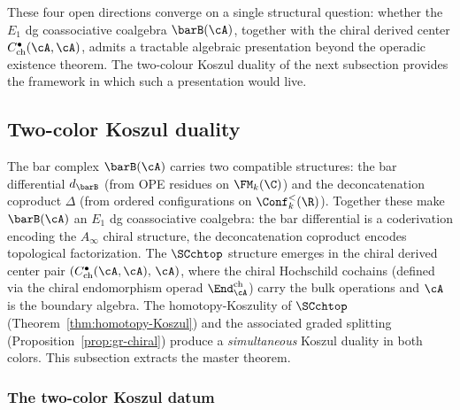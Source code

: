 These four open directions converge on a single structural
question: whether the $E_1$ dg coassociative coalgebra
$\barB(\cA)$, together with the chiral derived center
$C^\bullet_{\mathrm{ch}}(\cA,\cA)$, admits a tractable algebraic
presentation beyond the operadic existence theorem. The
two-colour Koszul duality of the next subsection provides the
framework in which such a presentation would live.


\subsection{Two-color Koszul duality}
\label{subsec:two-color-koszul-duality}

The bar complex $\barB(\cA)$ carries two compatible structures:
the bar differential $d_{\barB}$ (from OPE residues on
$\FM_k(\C)$) and the deconcatenation coproduct $\Delta$
(from ordered configurations on $\Conf_k^{<}(\R)$).
Together these make $\barB(\cA)$ an $E_1$ dg coassociative
coalgebra: the bar differential is a coderivation encoding
the $A_\infty$ chiral structure, the deconcatenation coproduct
encodes topological factorization. The $\SCchtop$ structure
emerges in the chiral derived center pair
$(C^\bullet_{\mathrm{ch}}(\cA,\cA),\, \cA)$, where the
chiral Hochschild cochains (defined via the chiral endomorphism
operad $\End^{\mathrm{ch}}_\cA$) carry the bulk operations and
$\cA$ is the boundary algebra.
The homotopy-Koszulity of $\SCchtop$
(Theorem~\ref{thm:homotopy-Koszul}) and the associated graded
splitting (Proposition~\ref{prop:gr-chiral}) produce a
\emph{simultaneous} Koszul duality in both colors. This
subsection extracts the master theorem.

\subsubsection*{The two-color Koszul datum}

